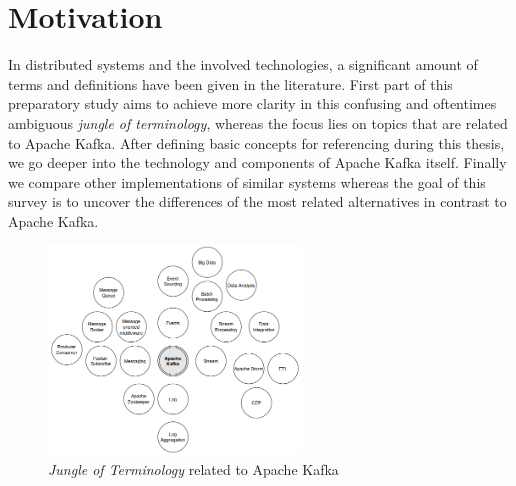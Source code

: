 \chapter{Motivation} 

In distributed systems and the involved technologies, a significant amount of
terms and definitions have been given in the literature. First part of this
preparatory study aims to achieve more clarity in this confusing and oftentimes
ambiguous \textit{jungle of terminology}, whereas the focus lies on topics that
are related to Apache Kafka. After defining basic concepts for referencing
during this thesis, we go deeper into the technology and components of Apache
Kafka itself. Finally we compare other implementations of similar systems
whereas the goal of this survey is to uncover the differences of the most
related alternatives in contrast to Apache Kafka. \\

\begin{figure}[H]
    \centering
    \includegraphics[width=0.6\textwidth]{images/jungle-of-terminology.png}
    \caption{\textit{Jungle of Terminology} related to Apache Kafka}
    \label{fig:jungle-of-terminology}
\end{figure}

